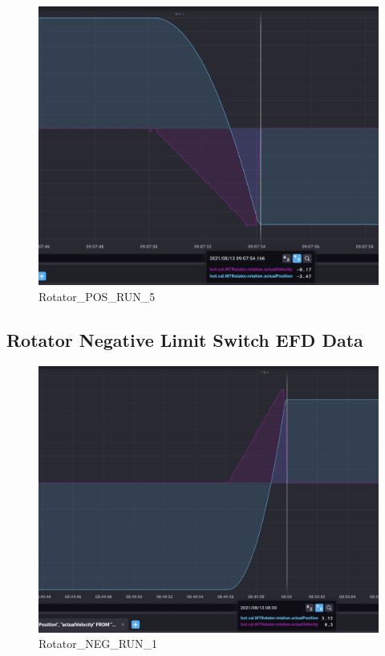 \documentclass[SE,authoryear,toc, lsstdraft]{lsstdoc}
\begin{document}
\begin{figure}
  \includegraphics[width=\linewidth]{media/rotator_pos_5.png}
  \caption{Rotator\_POS\_RUN\_5}
  \label{fig:Rotator_POS_RUN_5}
\end{figure}
\newpage
\subsection{Rotator Negative Limit Switch EFD Data}
\begin{figure}
  \includegraphics[width=\linewidth]{media/rotator_neg_1.png}
  \caption{Rotator\_NEG\_RUN\_1}
  \label{fig:Rotator_NEG_RUN_1}
\end{figure}
\end{document}
